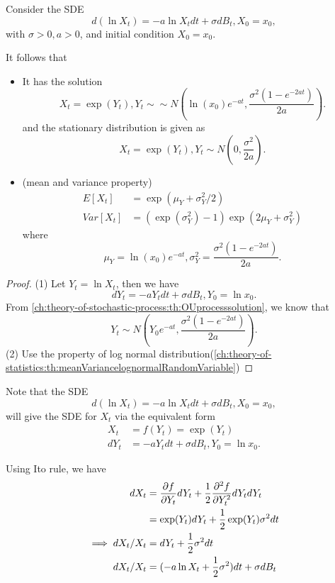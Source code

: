 \begin{refsection}
\begin{lemma}\label{ch:theory-of-stochastic-process:th:ExponentialOUprocesssolution}
	Consider the SDE
	$$d(\ln X_t) = -a \ln X_t dt + \sigma dB_t,X_0 = x_0,$$
	with $\sigma > 0, a > 0$, and initial condition $X_0 = x_0$.
	
	It follows that
	\begin{itemize}
		\item It has the solution 
		$$X_t = \exp(Y_t), Y_t\sim \sim N(\ln(x_0) e^{-at}, \frac{\sigma^2(1- e^{-2at})}{2a}).$$
		and the stationary distribution is given as
		$$X_t = \exp(Y_t), Y_t \sim N(0, \frac{\sigma^2}{2a}).$$
		\item (mean and variance property)
		\begin{align*}
		E[X_t] &= \exp(\mu_Y + \sigma^2_Y/2)\\
		Var[X_t] &= (\exp(\sigma_Y^2)-1)\exp(2\mu_Y + \sigma^2_Y)
		\end{align*}
		where $$\mu_Y = \ln(x_0) e^{-at}, \sigma_Y^2 = \frac{\sigma^2(1- e^{-2at})}{2a}. $$
	\end{itemize}	
\end{lemma}
\begin{proof}
	(1)	
	Let $Y_t = \ln X_t$, then we have
	$$dY_t = -a Y_t dt + \sigma dB_t, Y_0 = \ln x_0.$$
	From \autoref{ch:theory-of-stochastic-process:th:OUprocesssolution}, we know that
	$$Y_t \sim N(Y_0 e^{-at}, \frac{\sigma^2(1- e^{-2at})}{2a}).$$ 	
	(2) Use the property of log normal distribution(\autoref{ch:theory-of-statistics:th:meanVariancelognormalRandomVariable})	
\end{proof}

\begin{remark}
	Note that the SDE 
	$$d(\ln X_t) = -a \ln X_t dt + \sigma dB_t,X_0 = x_0,$$
	will give the SDE for $X_t$ via the equivalent form
	\begin{align*}
	X_t &= f(Y_t) = \exp(Y_t) \\
	dY_t &= -a Y_t dt + \sigma dB_t, Y_0 = \ln x_0.
	\end{align*}
	
	Using Ito rule, we have
	\begin{align*}
	dX_t &= \frac{\partial f}{\partial Y_t} dY_t + \frac{1}{2}\frac{\partial^2 f}{\partial Y_t^2} dY_tdY_t \\
	&=\exp(Y_t)dY_t + \frac{1}{2}\exp(Y_t) \sigma^2 dt\\
	\implies dX_t/X_t&= dY_t + \frac{1}{2}\sigma^2 dt\\
	dX_t/X_t&= (-a \ln X_t + \frac{1}{2}\sigma^2 )dt + \sigma dB_t\\
	\end{align*}
	

\end{remark}
\end{refsection}
